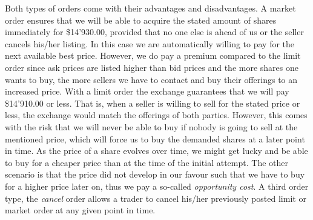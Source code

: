 Both types of orders come with their advantages and disadvantages.
A market order ensures that we will be able to acquire the stated amount of shares immediately for \$14'930.00, provided that no one else is ahead of us or the seller cancels his/her listing.
In this case we are automatically willing to pay for the next available best price.
However, we do pay a premium compared to the limit order since ask prices are listed higher than bid prices and the more shares one wants to buy, the more sellers we have to contact and buy their offerings to an increased price.
With a limit order the exchange guarantees that we will pay \$14'910.00 or less.
That is, when a seller is willing to sell for the stated price or less, the exchange would match the offerings of both parties.
However, this comes with the risk that we will never be able to buy if nobody is going to sell at the mentioned price, which will force us to buy the demanded shares at a later point in time.
As the price of a share evolves over time, we might get lucky and be able to buy for a cheaper price than at the time of the initial attempt.
The other scenario is that the price did not develop in our favour such that we have to buy for a higher price later on, thus we pay a so-called \textit{opportunity cost}.
A third order type, the \textit{cancel} order allows a trader to cancel his/her previously posted limit or market order at any given point in time.

